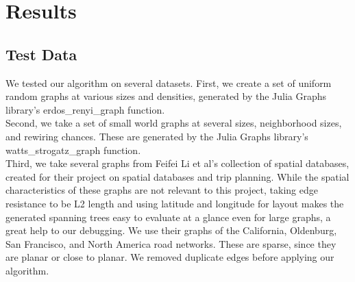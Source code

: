 \documentclass{article}
\begin{document}
\section*{Results}


\subsection*{Test Data}
We tested our algorithm on several datasets.  First, we create a set of uniform random graphs at various sizes and densities, generated by the Julia Graphs library's erdos\_renyi\_graph function.\\
Second, we take a set of small world graphs at several sizes, neighborhood sizes, and rewiring chances.  These are generated by the Julia Graphs library's watts\_strogatz\_graph function.\\
Third, we take several graphs from Feifei Li et al's collection of spatial databases\cite{feifei-data}, created for their project on spatial databases and trip planning\cite{feifei-paper}.  While the spatial characteristics of these graphs are not relevant to this project, taking edge resistance to be L2 length and using latitude and longitude for layout makes the generated spanning trees easy to evaluate at a glance even for large graphs, a great help to our debugging.  We use their graphs of the California, Oldenburg, San Francisco, and North America road networks.  These are sparse, since they are planar or close to planar.  We removed duplicate edges before applying our algorithm.  
{}

\end{document}

